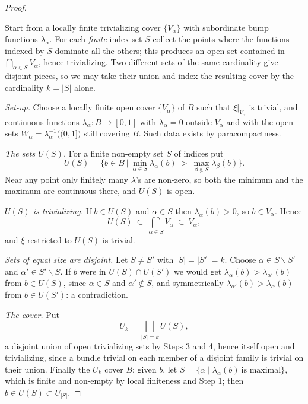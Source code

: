 \begin{proof}
\begin{strategy}
Start from a locally finite trivializing cover $\{V_\alpha\}$ with subordinate
bump functions $\lambda_\alpha$. For each \emph{finite} index set $S$ collect the
points where the functions indexed by $S$ dominate all the others; this produces
an open set contained in $\bigcap_{\alpha\in S}V_\alpha$, hence trivializing.
Two different sets of the same cardinality give disjoint pieces, so we may take
their union and index the resulting cover by the cardinality $k=|S|$ alone.
\end{strategy}

 \emph{Set-up.} Choose a locally finite open cover $\{V_\alpha\}$ of $B$
such that $\xi|_{V_\alpha}$ is trivial, and continuous functions
$\lambda_\alpha\colon B\to[0,1]$ with $\lambda_\alpha=0$ outside $V_\alpha$ and
with the open sets $W_\alpha=\lambda_\alpha^{-1}\big((0,1]\big)$ still covering
$B$. Such data exists by paracompactness.

 \emph{The sets $U(S)$.} For a finite non-empty set $S$ of indices put
\[
U(S)=\Big\{b\in B\ \Big|\ \min_{\alpha\in S}\lambda_\alpha(b)
\ >\ \max_{\beta\notin S}\lambda_\beta(b)\Big\}.
\]
Near any point only finitely many $\lambda$'s are non-zero, so both the minimum
and the maximum are continuous there, and $U(S)$ is open.

 \emph{$U(S)$ is trivializing.} If $b\in U(S)$ and $\alpha\in S$ then
$\lambda_\alpha(b)>0$, so $b\in V_\alpha$. Hence
\[
U(S)\ \subset\ \bigcap_{\alpha\in S}V_\alpha\ \subset\ V_\alpha ,
\]
and $\xi$ restricted to $U(S)$ is trivial.

 \emph{Sets of equal size are disjoint.} Let $S\neq S'$ with
$|S|=|S'|=k$. Choose $\alpha\in S\smallsetminus S'$ and
$\alpha'\in S'\smallsetminus S$. If $b$ were in $U(S)\cap U(S')$ we would get
$\lambda_\alpha(b)>\lambda_{\alpha'}(b)$ from $b\in U(S)$, since
$\alpha\in S$ and $\alpha'\notin S$, and symmetrically
$\lambda_{\alpha'}(b)>\lambda_\alpha(b)$ from $b\in U(S')$: a contradiction.

 \emph{The cover.} Put
\[
U_k=\bigsqcup_{|S|=k}U(S),
\]
a disjoint union of open trivializing sets by Steps 3 and 4, hence itself open
and trivializing, since a bundle trivial on each member of a disjoint family is
trivial on their union. Finally the $U_k$ cover $B$: given $b$, let
$S=\{\alpha\mid\lambda_\alpha(b)\ \text{is maximal}\}$, which is finite and
non-empty by local finiteness and Step 1; then $b\in U(S)\subset U_{|S|}$.
\end{proof}

